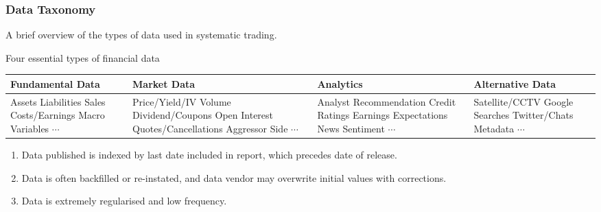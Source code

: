 \subsubsection{Data Taxonomy}

A brief overview of the types of data used in systematic trading.

\begin{flushleft}
Four essential types of financial data
\begin{tabularx}{\textwidth}{X|X|p{13em}|X}
\hline
\rowcolor{gray!30}
Fundamental Data & Market Data & Analytics & Alternative Data \\
\hline
Assets \newline
Liabilities \newline
Sales \newline
Costs/Earnings \newline
Macro Variables \newline
$\cdots$
&
Price/Yield/IV \newline
Volume \newline
Dividend/Coupons \newline
Open Interest \newline
Quotes/Cancellations \newline
Aggressor Side \newline
$\cdots$
&
Analyst Recommendation \newline
Credit Ratings \newline
Earnings Expectations \newline
News Sentiment \newline
$\cdots$
&
Satellite/CCTV \newline
Google Searches \newline
Twitter/Chats \newline
Metadata \newline
$\cdots$ \\
\hline
\end{tabularx}
\end{flushleft}

\begin{remark} 
\begin{enumerate}[label=\roman*.]
\setlength{\itemsep}{0pt}
\item Data published is indexed by last date included in report, which precedes date of release.
\item Data is often backfilled or re-instated, and data vendor may overwrite initial values with corrections.
\item Data is extremely regularised and low frequency.
\end{enumerate}
\end{remark}

